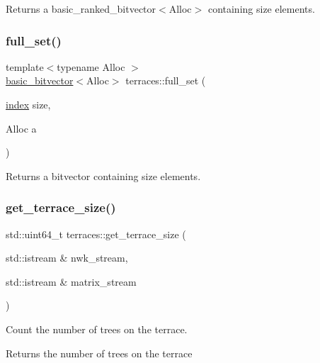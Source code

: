 Returns a basic\+\_\+ranked\+\_\+bitvector$<$\+Alloc$>$ containing size elements. \mbox{\label{namespaceterraces_a89a9c3d18566c475960fa9bbe5954049}} 
\subsubsection{\texorpdfstring{full\+\_\+set()}{full\_set()}}
{\footnotesize\ttfamily template$<$typename Alloc $>$ \\
\hyperlink{classterraces_1_1basic__bitvector}{basic\+\_\+bitvector}$<$Alloc$>$ terraces\+::full\+\_\+set (\begin{DoxyParamCaption}\item[{\hyperlink{namespaceterraces_adbc33ccb543d1634e96d0eb02e472c77}{index}}]{size,  }\item[{Alloc}]{a }\end{DoxyParamCaption})}

Returns a bitvector containing size elements. \mbox{\label{namespaceterraces_a7ef22320b680e0859629f36e6366095b}} 
\subsubsection{\texorpdfstring{get\+\_\+terrace\+\_\+size()}{get\_terrace\_size()}\hspace{0.1cm}{\footnotesize\ttfamily [1/4]}}
{\footnotesize\ttfamily std\+::uint64\+\_\+t terraces\+::get\+\_\+terrace\+\_\+size (\begin{DoxyParamCaption}\item[{std\+::istream \&}]{nwk\+\_\+stream,  }\item[{std\+::istream \&}]{matrix\+\_\+stream }\end{DoxyParamCaption})}

Count the number of trees on the terrace. \begin{DoxyReturn}{Returns}
the number of trees on the terrace 
\end{DoxyReturn}
\mbox{\label{namespaceterraces_a3d63d1aacb79fba0eec3047276257247}} 
